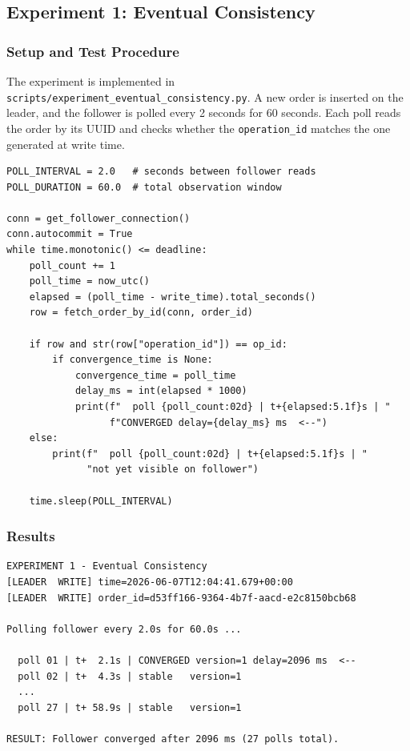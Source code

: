 \documentclass[12pt,a4paper]{article}
\begin{document}
\subsection{Experiment 1: Eventual Consistency}

\subsubsection{Setup and Test Procedure}

The experiment is implemented in \texttt{scripts/experiment\_eventual\_consistency.py}.
A new order is inserted on the leader, and the follower is polled every 2 seconds
for 60 seconds. Each poll reads the order by its UUID and checks whether the
\texttt{operation\_id} matches the one generated at write time.

\begin{lstlisting}[style=pythonstyle, caption={Core polling loop -- Experiment 1}]
POLL_INTERVAL = 2.0   # seconds between follower reads
POLL_DURATION = 60.0  # total observation window

conn = get_follower_connection()
conn.autocommit = True
while time.monotonic() <= deadline:
    poll_count += 1
    poll_time = now_utc()
    elapsed = (poll_time - write_time).total_seconds()
    row = fetch_order_by_id(conn, order_id)

    if row and str(row["operation_id"]) == op_id:
        if convergence_time is None:
            convergence_time = poll_time
            delay_ms = int(elapsed * 1000)
            print(f"  poll {poll_count:02d} | t+{elapsed:5.1f}s | "
                  f"CONVERGED delay={delay_ms} ms  <--")
    else:
        print(f"  poll {poll_count:02d} | t+{elapsed:5.1f}s | "
              "not yet visible on follower")

    time.sleep(POLL_INTERVAL)
\end{lstlisting}

\subsubsection{Results}

\begin{lstlisting}[style=outputstyle, caption={Experiment 1 output}]
EXPERIMENT 1 - Eventual Consistency
[LEADER  WRITE] time=2026-06-07T12:04:41.679+00:00
[LEADER  WRITE] order_id=d53ff166-9364-4b7f-aacd-e2c8150bcb68

Polling follower every 2.0s for 60.0s ...

  poll 01 | t+  2.1s | CONVERGED version=1 delay=2096 ms  <--
  poll 02 | t+  4.3s | stable   version=1
  ...
  poll 27 | t+ 58.9s | stable   version=1

RESULT: Follower converged after 2096 ms (27 polls total).
\end{lstlisting}
\end{document}
